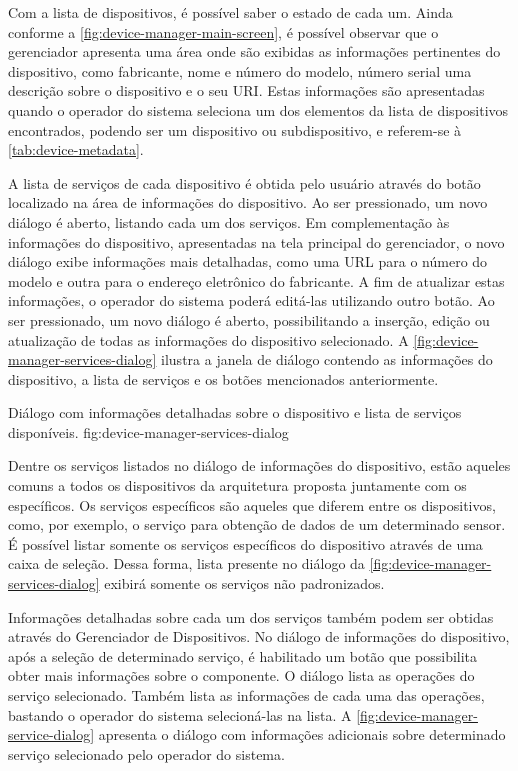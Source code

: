 Com a lista de dispositivos, é possível saber o estado de cada um. Ainda conforme a
\cref{fig:device-manager-main-screen}, é possível observar que o gerenciador apresenta uma área onde
são exibidas as informações pertinentes do dispositivo, como fabricante, nome e número do modelo,
número serial uma descrição sobre o dispositivo e o seu \gls{URI}. Estas informações são
apresentadas quando o operador do sistema seleciona um dos elementos da lista de dispositivos
encontrados, podendo ser um dispositivo ou subdispositivo, e referem-se à \cref{tab:device-metadata}.

A lista de serviços de cada dispositivo é obtida pelo usuário através do botão localizado na área de
informações do dispositivo. Ao ser pressionado, um novo diálogo é aberto, listando cada um dos
serviços. Em complementação às informações do dispositivo, apresentadas na tela principal do
gerenciador, o novo diálogo exibe informações mais detalhadas, como uma \gls{URL} para o número do
modelo e outra para o endereço eletrônico do fabricante. A fim de atualizar estas informações, o
operador do sistema poderá editá-las utilizando outro botão. Ao ser pressionado, um novo diálogo é
aberto, possibilitando a inserção, edição ou atualização de todas as informações do dispositivo
selecionado. A \cref{fig:device-manager-services-dialog} ilustra a janela de diálogo contendo as
informações do dispositivo, a lista de serviços e os botões mencionados anteriormente.

  {Diálogo com informações detalhadas sobre o dispositivo e lista de serviços disponíveis.}
  {fig:device-manager-services-dialog}

Dentre os serviços listados no diálogo de informações do dispositivo, estão aqueles comuns a todos
os dispositivos da arquitetura proposta juntamente com os específicos. Os serviços específicos são
aqueles que diferem entre os dispositivos, como, por exemplo, o serviço para obtenção de dados de um
determinado sensor. É possível listar somente os serviços específicos do dispositivo através de uma
caixa de seleção. Dessa forma, lista presente no diálogo da
\cref{fig:device-manager-services-dialog} exibirá somente os serviços não padronizados.

Informações detalhadas sobre cada um dos serviços também podem ser obtidas através do Gerenciador de
Dispositivos. No diálogo de informações do dispositivo, após a seleção de determinado serviço, é
habilitado um botão que possibilita obter mais informações sobre o componente. O diálogo lista as
operações do serviço selecionado. Também lista as informações de cada uma das operações, bastando o
operador do sistema selecioná-las na lista. A \cref{fig:device-manager-service-dialog} apresenta o
diálogo com informações adicionais sobre determinado serviço selecionado pelo operador do sistema.

